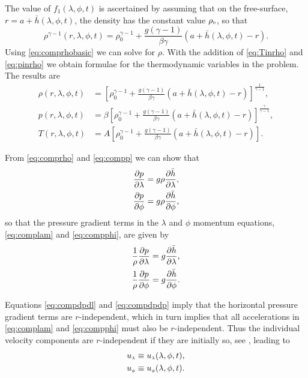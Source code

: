 The value of $f_1(\lambda,\phi,t)$ is ascertained by assuming that on the free-surface,  $r=a+\bar{h}(\lambda,\phi,t)$, the density has the constant value ${\rho_{\scriptscriptstyle 0}}$, so that
\begin{equation}
\rho^{\gamma-1}(r,\lambda,\phi,t)=\rho^{\gamma-1}_{\scriptscriptstyle 0}+\frac{g(\gamma-1)}{\beta \gamma} (a+\bar{h}(\lambda,\phi,t)-r). \label{eq:comprhobasic}
\end{equation}
Using \eqref{eq:comprhobasic} we can solve for $\rho$. With the addition of \eqref{eq:Tinrho} and \eqref{eq:pinrho} we obtain formulae for the thermodynamic variables in the problem. The results are
\begin{align}
\rho(r,\lambda,\phi,t) &=\left[\rho^{\gamma-1}_{\scriptscriptstyle 0}+\frac{g(\gamma-1)}{\beta \gamma} (a+\bar{h}(\lambda,\phi,t)-r) \right]^{\frac{1}{\gamma-1}}, \label{eq:comprho}\\
p(r,\lambda,\phi,t) &= \beta\left[\rho^{\gamma-1}_{\scriptscriptstyle 0}+\frac{g(\gamma-1)}{\beta \gamma} (a+\bar{h}(\lambda,\phi,t)-r) \right]^{\frac{\gamma}{\gamma-1}}, \label{eq:compp}\\
T(r,\lambda,\phi,t) &= A\left[\rho^{\gamma-1}_{\scriptscriptstyle 0}+\frac{g(\gamma-1)}{\beta \gamma} (a+\bar{h}(\lambda,\phi,t)-r) \right] .\label{eq:compT}
\end{align}

From \eqref{eq:comprho} and \eqref{eq:compp} we can show that
\begin{align}
{\ensuremath{\frac{\partial p}{\partial \lambda}}}&=g \rho {\ensuremath{\frac{\partial \bar{h}}{\partial \lambda}}},\\
{\frac{\partial p}{\partial \phi}}&=g \rho {\ensuremath{\frac{\partial \bar{h}}{\partial \phi}}},
\end{align}
so that the pressure gradient terms in the $\lambda$ and $\phi$ momentum equations, \eqref{eq:complam} and \eqref{eq:compphi}, are given by
\begin{align}
\frac{1}{\rho} {\frac{\partial p}{\partial \lambda}}&=g {\frac{\partial \bar{h}}{\partial \lambda}},\label{eq:compdpdl}\\
\frac{1}{\rho} {\frac{\partial p}{\partial \phi}}&=g {\frac{\partial \bar{h}}{\partial \phi}}. \label{eq:compdpdp}
\end{align}

Equations \eqref{eq:compdpdl} and \eqref{eq:compdpdp} imply that the horizontal pressure gradient terms are $r$-independent, which in turn implies that all accelerations in \eqref{eq:complam} and \eqref{eq:compphi} must also be $r$-independent. Thus the individual velocity components are $r$-independent if they are initially so, see \cite{Pedlosky:GFD}, leading to
\begin{align}
{\ensuremath{u_{\scriptscriptstyle \lambda}}} &\equiv {\ensuremath{u_{\scriptscriptstyle \lambda}}}(\lambda,\phi,t), \label{eq:ulamnor}\\
{u_{\scriptscriptstyle \phi}} &\equiv {\ensuremath{u_{\scriptscriptstyle \phi}}}(\lambda,\phi,t). \label{eq:uphinor}
\end{align}

